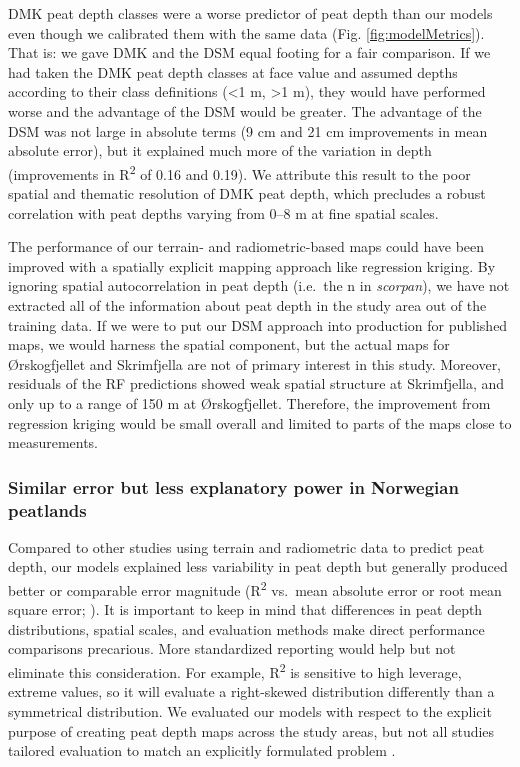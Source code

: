 \documentclass[soil, manuscript]{copernicus}
\begin{document}
DMK peat depth classes were a worse predictor of peat depth than our models even though we calibrated them with the same data (Fig. \ref{fig:modelMetrics}).
That is: we gave DMK and the DSM equal footing for a fair comparison.
If we had taken the DMK peat depth classes at face value and assumed depths according to their class definitions (\textless1 m, \textgreater1 m), they would have performed worse and the advantage of the DSM would be greater.
The advantage of the DSM was not large in absolute terms (9 cm and 21 cm improvements in mean absolute error), but it explained much more of the variation in depth (improvements in R\textsuperscript{2} of 0.16 and 0.19).
We attribute this result to the poor spatial and thematic resolution of DMK peat depth, which precludes a robust correlation with peat depths varying from 0--8 m at fine spatial scales.

The performance of our terrain- and radiometric-based maps could have been improved with a spatially explicit mapping approach like regression kriging.
By ignoring spatial autocorrelation in peat depth (i.e.~the n in \emph{scorpan}), we have not extracted all of the information about peat depth in the study area out of the training data.
If we were to put our DSM approach into production for published maps, we would harness the spatial component, but the actual maps for Ørskogfjellet and Skrimfjella are not of primary interest in this study.
Moreover, residuals of the RF predictions showed weak spatial structure at Skrimfjella, and only up to a range of 150 m at Ørskogfjellet.
Therefore, the improvement from regression kriging would be small overall and limited to parts of the maps close to measurements.

\subsubsection{Similar error but less explanatory power in Norwegian peatlands}

Compared to other studies using terrain and radiometric data to predict peat depth, our models explained less variability in peat depth but generally produced better or comparable error magnitude (R\textsuperscript{2} vs.~mean absolute error or root mean square error; \citet{wadouxIntegratedApproachEvaluation2022}).
It is important to keep in mind that differences in peat depth distributions, spatial scales, and evaluation methods make direct performance comparisons precarious.
More standardized reporting would help but not eliminate this consideration.
For example, R\textsuperscript{2} is sensitive to high leverage, extreme values, so it will evaluate a right-skewed distribution differently than a symmetrical distribution.
We evaluated our models with respect to the explicit purpose of creating peat depth maps across the study areas, but not all studies tailored evaluation to match an explicitly formulated problem \citep{milaNearestNeighbourDistance2022}.
\end{document}
